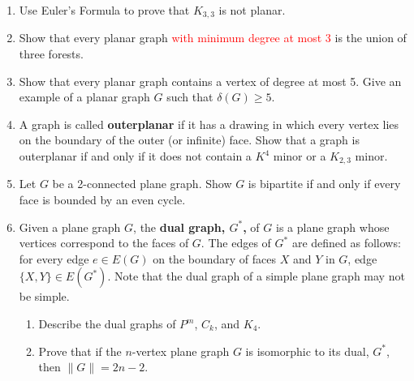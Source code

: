 \documentclass[12pt]{article}
\renewcommand{\emph}[1]{\textsf{\textbf{#1}}}
\begin{document}
\begin{enumerate}
	\item Use Euler's Formula to prove that $K_{3,3}$ is not planar.
	\item Show that every planar graph \textcolor{red}{with minimum degree at most 3} is the union of three forests. 
	\item Show that every planar graph contains a vertex of degree at most 5. Give an example of a planar graph $G$ such that $\delta(G) \geq 5.$
	\item A graph is called \emph{outerplanar} if it has a drawing in which every vertex lies on the boundary of the outer (or infinite) face. Show that a graph is outerplanar if and only if it does not contain a $K^4$ minor or a $K_{2,3}$ minor.
	\item Let $G$ be a 2-connected plane graph. Show $G$ is bipartite if and only if every face is bounded by an even cycle.
	\item Given a plane graph $G$, the \emph{dual graph, $G^*$,} of $G$ is a plane graph whose vertices correspond to the faces of $G$. The edges of $G^*$ are defined as follows: for every edge $e \in E(G)$ on the boundary of faces $X$ and $Y$ in $G$, edge $\{X,Y\} \in E(G^*).$ Note that the dual graph of a simple plane graph may not be simple.
	\begin{enumerate}
	\item Describe the dual graphs of $P^m$, $C_k$, and $K_4.$
	\item Prove that if the $n$-vertex plane graph $G$ is isomorphic to its dual, $G^*$, then $\parallel G \parallel = 2n-2.$
	\end{enumerate}
\end{enumerate}
\end{document}
